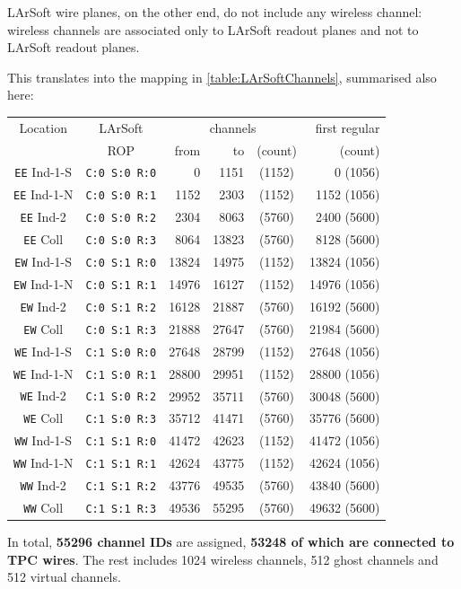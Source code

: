 LArSoft wire planes, on the other end, do not include any wireless channel:
wireless channels are associated only to LArSoft readout planes
and not to LArSoft readout planes.

This translates into the mapping in \cref{table:LArSoftChannels}, summarised also here:
\begin{center}
  \begin{tabular}{|cc|rrc|r|}
    \hline
    \hline
    Location            & LArSoft              & \multicolumn{3}{c|}{channels}
                                                                         & first regular \\
                        & ROP                  &  from &    to & (count) &       (count) \\
    \hline
    \texttt{EE} Ind-1-S & \texttt{C:0 S:0 R:0} &     0 &  1151 &  (1152) &      0 (1056) \\
    \texttt{EE} Ind-1-N & \texttt{C:0 S:0 R:1} &  1152 &  2303 &  (1152) &   1152 (1056) \\
    \texttt{EE} Ind-2   & \texttt{C:0 S:0 R:2} &  2304 &  8063 &  (5760) &   2400 (5600) \\
    \texttt{EE} Coll    & \texttt{C:0 S:0 R:3} &  8064 & 13823 &  (5760) &   8128 (5600) \\
    \hline
    \texttt{EW} Ind-1-S & \texttt{C:0 S:1 R:0} & 13824 & 14975 &  (1152) &  13824 (1056) \\
    \texttt{EW} Ind-1-N & \texttt{C:0 S:1 R:1} & 14976 & 16127 &  (1152) &  14976 (1056) \\
    \texttt{EW} Ind-2   & \texttt{C:0 S:1 R:2} & 16128 & 21887 &  (5760) &  16192 (5600) \\
    \texttt{EW} Coll    & \texttt{C:0 S:1 R:3} & 21888 & 27647 &  (5760) &  21984 (5600) \\
    \hline
    \hline
    \texttt{WE} Ind-1-S & \texttt{C:1 S:0 R:0} & 27648 & 28799 &  (1152) &  27648 (1056) \\
    \texttt{WE} Ind-1-N & \texttt{C:1 S:0 R:1} & 28800 & 29951 &  (1152) &  28800 (1056) \\
    \texttt{WE} Ind-2   & \texttt{C:1 S:0 R:2} & 29952 & 35711 &  (5760) &  30048 (5600) \\
    \texttt{WE} Coll    & \texttt{C:1 S:0 R:3} & 35712 & 41471 &  (5760) &  35776 (5600) \\
    \hline
    \texttt{WW} Ind-1-S & \texttt{C:1 S:1 R:0} & 41472 & 42623 &  (1152) &  41472 (1056) \\
    \texttt{WW} Ind-1-N & \texttt{C:1 S:1 R:1} & 42624 & 43775 &  (1152) &  42624 (1056) \\
    \texttt{WW} Ind-2   & \texttt{C:1 S:1 R:2} & 43776 & 49535 &  (5760) &  43840 (5600) \\
    \texttt{WW} Coll    & \texttt{C:1 S:1 R:3} & 49536 & 55295 &  (5760) &  49632 (5600) \\
    \hline
    \hline
  \end{tabular}
  \label{tab:LArSoftChannelsReduced}
\end{center}
In total, \textbf{55296 channel IDs} are assigned,
\textbf{53248 of which are connected to TPC wires}.
The rest includes 1024 wireless channels, 512 ghost channels and
512 virtual channels.

